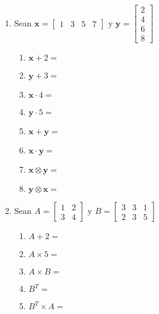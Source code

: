 \documentclass[spanish, 10pt]{article}
\begin{document}
\begin{enumerate}
    \itemsep2.5ex
    \item Sean $\mathbf{x} =\begin{bmatrix}
        1 & 3 & 5 & 7
    \end{bmatrix}$ \quad y \quad
    $\mathbf{y} = \begin{bmatrix}
        2 \\
        4 \\
        6 \\
        8
    \end{bmatrix}$

        \bigskip

    \begin{enumerate}
        \item $\mathbf{x} + 2 =$
        \item $\mathbf{y} + 3 =$
        \item $\mathbf{x} \cdot 4 =$
        \item $\mathbf{y}  \cdot 5 =$
        \item $\mathbf{x} + \mathbf{y} =$
        \item $\mathbf{x} \cdot \mathbf{y} =$
        \item $\mathbf{x} \otimes \mathbf{y} =$
        \item $\mathbf{y} \otimes \mathbf{x} =$
    \end{enumerate}

    \item Sean $ A = \begin{bmatrix}
        1 & 2\\
        3 & 4
    \end{bmatrix}$ \quad y
    $B = \begin{bmatrix}
        3 & 3 & 1\\
        2 & 3 & 5
    \end{bmatrix}$
    
    \bigskip

    \begin{enumerate}
        \item $A + 2 =$
        \item $A \times 5 =$
        \item $A \times B =$
        \item $B^T = $
        \item $B^T \times A = $
    \end{enumerate}
\end{enumerate}
\end{document}
